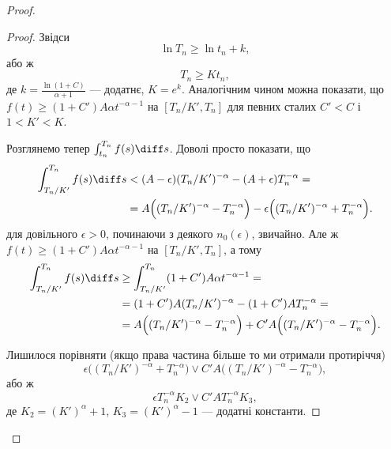 \begin{proof}
\begin{proof}
        Звідси
        \begin{equation}
            \ln T_n \ge \ln t_n + k,
        \end{equation}
        або ж
        \begin{equation}
            T_n \ge K t_n,
        \end{equation}
        де $k = \frac{\ln (1 + C)}{\alpha + 1}$ --- додатнє, $K = e^k$. Аналогічним чином можна показати, що $f(t) \ge (1 + C') A \alpha t^{-\alpha - 1}$ на $[T_n/K', T_n]$ для певних сталих $C' < C$ і $1 < K' < K$. \medskip
        
        Розглянемо тепер $\int_{t_n}^{T_n} f(s) \diff s$. Доволі просто показати, що 
        \begin{equation}
            \begin{aligned}
                \int_{T_n / K'}^{T_n} f(s) \diff s 
                &< (A - \epsilon) (T_n/K')^{-\alpha} - (A + \epsilon) T_n^{-\alpha} = \\
                &= A \Big( (T_n/K')^{-\alpha} - T_n^{-\alpha} \Big) - \epsilon \Big( (T_n/K')^{-\alpha} + T_n^{-\alpha} \Big).
            \end{aligned}
        \end{equation}
        для довільного $\epsilon > 0$, починаючи з деякого $n_0(\epsilon)$, звичайно. Але ж $f(t) \ge (1 + C') A \alpha t^{-\alpha - 1}$ на $[T_n/K', T_n]$, а тому
        \begin{equation}
            \begin{aligned}
                \int_{T_n/K'}^{T_n} f(s) \diff s 
                &\ge \int_{T_n/K'}^{T_n} (1 + C') A \alpha t^{-\alpha - 1} = \\
                &= (1 + C') A (T_n/K')^{-\alpha} - (1 + C') A T_n^{-\alpha} = \\
                &= A \Big( (T_n/K')^{-\alpha} - T_n^{-\alpha} \Big) + C' A \Big( (T_n/K')^{-\alpha} - T_n^{-\alpha} \Big).
            \end{aligned}
        \end{equation}
        
        Лишилося порівняти (якщо права частина більше то ми отримали протиріччя)
        \begin{equation}
            \epsilon \Big( (T_n/K')^{-\alpha} + T_n^{-\alpha} \Big) \lor C' A \Big( (T_n/K')^{-\alpha} - T_n^{-\alpha} \Big),
        \end{equation}
        або ж
        \begin{equation}
            \epsilon T_n^{-\alpha} K_2 \lor C' A T_n^{-\alpha} K_3,
        \end{equation}
        де $K_2 = (K')^\alpha + 1$, $K_3 = (K')^\alpha - 1$ --- додатні константи. \medskip
        

\end{proof}
\end{proof}
